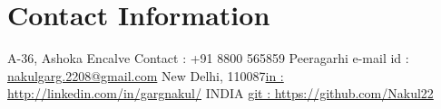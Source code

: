\newenvironment{outerlist}[1][\enskip\textbullet]%
        {\begin{itemize}[#1,leftmargin=*]}{\end{itemize}%
         \vspace{-.6\baselineskip}}

\newenvironment{lonelist}[1][\enskip\textbullet]%
        {\begin{list}{#1}{%
        \setlength{\partopsep}{0pt}%
        \setlength{\topsep}{0pt}}}
        {\end{list}\vspace{-.6\baselineskip}}

\newenvironment{innerlist}[1][\enskip\textbullet]%
        {\begin{itemize}[#1,leftmargin=*,parsep=0pt,itemsep=0pt,topsep=0pt,partopsep=0pt]}
        {\end{itemize}}

\newenvironment{loneinnerlist}[1][\enskip\textbullet]%
        {\begin{itemize}[#1,leftmargin=*,parsep=0pt,itemsep=0pt,topsep=0pt,partopsep=0pt]}
        {\end{itemize}\vspace{-.6\baselineskip}}

\newcommand{\blankline}{\quad\pagebreak[3]}
\newcommand{\halfblankline}{\quad\vspace{-0.5\baselineskip}\pagebreak[3]}

\newcommand\doilink[1]{\href{http://dx.doi.org/#1}{#1}}
\newcommand\doi[1]{doi:\doilink{#1}}

\providecommand*\url[1]{\href{#1}{#1}}
\renewcommand*\url[1]{\href{#1}{\texttt{#1}}}
\providecommand*\email[1]{\href{mailto:#1}{#1}}

\providecommand\BibTeX{{B\kern-.05em{\sc i\kern-.025em b}\kern-.08em
    \TeX}}
\providecommand\Matlab{\textsc{Matlab}}




\section{Contact Information}

\newlength{\rcollength}\setlength{\rcollength}{1.4in}%


A-36, Ashoka Encalve  \hfill {Contact : +91 8800 565859} \newline
Peeragarhi \hfill {e-mail id : \email{nakulgarg.2208@gmail.com}} \newline
New Delhi, 110087\hfill  \href{http://linkedin.com/in/gargnakul/}{in : http://linkedin.com/in/gargnakul/} \newline
INDIA \hfill \href{http://linkedin.com/in/gargnakul/}{git : https://github.com/Nakul22}



